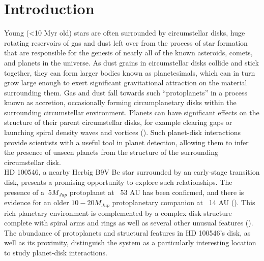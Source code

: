\documentclass{knac}
\begin{document}
\section{Introduction}
Young (<10 Myr old) stars are often surrounded by circumstellar disks, huge rotating reservoirs of gas and dust left over from the process of star formation that are responsible for the genesis of nearly all of the known asteroids, comets, and planets in the universe. As dust grains in circumstellar disks collide and stick together, they can form larger bodies known as planetesimals, which can in turn grow large enough to exert significant gravitational attraction on the material surrounding them. Gas and dust fall towards such ``protoplanets'' in a process known as accretion, occasionally forming circumplanetary disks within the surrounding circumstellar environment. Planets can have significant effects on the structure of their parent circumstellar disks, for example clearing gaps or launching spiral density waves and vortices (\citealt{Baruteau13}). Such planet-disk interactions provide scientists with a useful tool in planet detection, allowing them to infer the presence of unseen planets from the structure of the surrounding circumstellar disk. \\
\indent HD 100546, a nearby Herbig B9V Be star surrounded by an early-stage transition disk, presents a promising opportunity to explore such relationships. The presence of a $~5M_{Jup}$ protoplanet at ~53 AU has been confirmed, and there is evidence for an older $10-20 M_{Jup}$ protoplanetary companion at ~14 AU (\citealt{Quanz15, Currie15,Pinilla15}). This rich planetary environment is complemented by a complex disk structure complete with spiral arms and rings as well as several other unusual features (\citealt{Grady05, Boccaletti13, Walsh14}). The abundance of protoplanets and structural features in HD 100546's disk, as well as its proximity, distinguish the system as a particularly interesting location to study planet-disk interactions.
\end{document}
